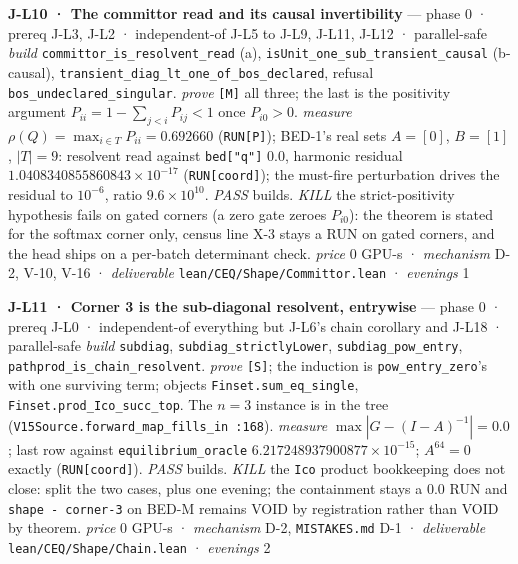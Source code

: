 \documentclass[11pt,a4paper]{article}
\theoremstyle{plain}
\theoremstyle{definition}
\theoremstyle{remark}
\begin{document}
\textbf{J-L10 · The committor read and its causal invertibility} ---
phase 0 · prereq J-L3, J-L2 · independent-of J-L5 to J-L9, J-L11, J-L12
· parallel-safe \emph{build} \texttt{committor\_is\_resolvent\_read}
(a), \texttt{isUnit\_one\_sub\_transient\_causal} (b-causal),
\texttt{transient\_diag\_lt\_one\_of\_bos\_declared}, refusal
\texttt{bos\_undeclared\_singular}. \emph{prove} \texttt{{[}M{]}} all
three; the last is the positivity argument
\(P_{ii}=1-\sum_{j<i}P_{ij}<1\) once \(P_{i0}>0\). \emph{measure}
\(\rho(Q)=\max_{i\in T}P_{ii}=0.692660\) (\texttt{RUN{[}P{]}}); BED-1's
real sets \(A=[0]\), \(B=[1]\), \(|T|=9\): resolvent read against
\texttt{bed{[}"q"{]}} \(0.0\), harmonic residual
\(1.0408340855860843\times10^{-17}\) (\texttt{RUN{[}coord{]}}); the
must-fire perturbation drives the residual to \(10^{-6}\), ratio
\(9.6\times10^{10}\). \emph{PASS} builds. \emph{KILL} the
strict-positivity hypothesis fails on gated corners (a zero gate zeroes
\(P_{i0}\)): the theorem is stated for the softmax corner only, census
line X-3 stays a RUN on gated corners, and the head ships on a per-batch
determinant check. \emph{price} \(0\) GPU-s · \emph{mechanism} D-2,
V-10, V-16 · \emph{deliverable} \texttt{lean/CEQ/Shape/Committor.lean} ·
\emph{evenings} 1

\textbf{J-L11 · Corner 3 is the sub-diagonal resolvent, entrywise} ---
phase 0 · prereq J-L0 · independent-of everything but J-L6's chain
corollary and J-L18 · parallel-safe \emph{build} \texttt{subdiag},
\texttt{subdiag\_strictlyLower}, \texttt{subdiag\_pow\_entry},
\texttt{pathprod\_is\_chain\_resolvent}. \emph{prove} \texttt{{[}S{]}};
the induction is \texttt{pow\_entry\_zero}'s with one surviving term;
objects \texttt{Finset.sum\_eq\_single},
\texttt{Finset.prod\_Ico\_succ\_top}. The \(n=3\) instance is in the
tree (\texttt{V15Source.forward\_map\_fills\_in\ :168}). \emph{measure}
\(\max|G-(I-A)^{-1}|=0.0\); last row against
\texttt{equilibrium\_oracle} \(6.217248937900877\times10^{-15}\);
\(A^{64}=0\) exactly (\texttt{RUN{[}coord{]}}). \emph{PASS} builds.
\emph{KILL} the \texttt{Ico} product bookkeeping does not close: split
the two cases, plus one evening; the containment stays a \(0.0\) RUN and
\texttt{shape\ -\ corner-3} on BED-M remains VOID by registration rather
than VOID by theorem. \emph{price} \(0\) GPU-s · \emph{mechanism} D-2,
\texttt{MISTAKES.md} D-1 · \emph{deliverable}
\texttt{lean/CEQ/Shape/Chain.lean} · \emph{evenings} 2
\end{document}
